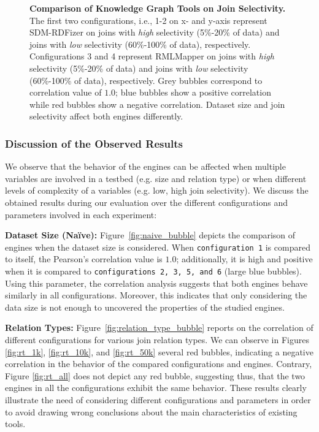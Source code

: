 \begin{figure}[!tb]
    \caption[Knowledge Graph Tools on Join Selectivity]{\textbf{Comparison of Knowledge Graph Tools on Join Selectivity.} The first two configurations, i.e., 1-2 on x- and y-axis represent SDM-RDFizer on joins with \textit{high} selectivity (5\%-20\% of data) and joins with \textit{low} selectivity (60\%-100\% of data), respectively.  Configurations 3 and 4 represent RMLMapper on joins with \textit{high} selectivity (5\%-20\% of data) and joins with \textit{low} selectivity (60\%-100\% of data), respectively. Grey bubbles correspond to correlation value of $1.0$; blue bubbles show a positive correlation while red bubbles show a negative correlation. Dataset size and join selectivity affect both engines differently.}
    \label{fig:joinselectivity_bubble}
\end{figure}
\subsubsection*{Discussion of the Observed Results}
We observe that the behavior of the engines can be affected when multiple variables are involved in a testbed (e.g. size and relation type) or when different levels of complexity of a variables (e.g. low, high join selectivity). We discuss the obtained results during our evaluation over the different configurations and parameters involved in each experiment:   

\noindent \textbf{Dataset Size (Na{\"i}ve):}
Figure~\ref{fig:naive_bubble} depicts the comparison of engines when the dataset size is considered. When \texttt{configuration 1} is compared to itself, the Pearson's correlation value is $1.0$; additionally, it is high and positive when it is compared to \texttt{configurations 2, 3, 5, and 6} (large blue bubbles). 
Using this parameter, the correlation analysis suggests that both engines behave similarly in all configurations. Moreover, this indicates that only considering the data size is not enough to uncovered the properties of the studied engines.








\noindent \textbf{Relation Types:}
Figure~\ref{fig:relation_type_bubble} reports on the correlation of different configurations for various join relation types. We can observe in Figures \ref{fig:rt_1k}, \ref{fig:rt_10k}, and \ref{fig:rt_50k} several red bubbles, indicating a negative correlation in the behavior of the compared configurations and engines. Contrary, Figure \ref{fig:rt_all} does not depict any red bubble, suggesting thus, that the two engines in all the configurations exhibit the same behavior. These results clearly illustrate the need of considering different configurations and parameters in order to avoid drawing wrong conclusions about the main characteristics of existing tools. 



